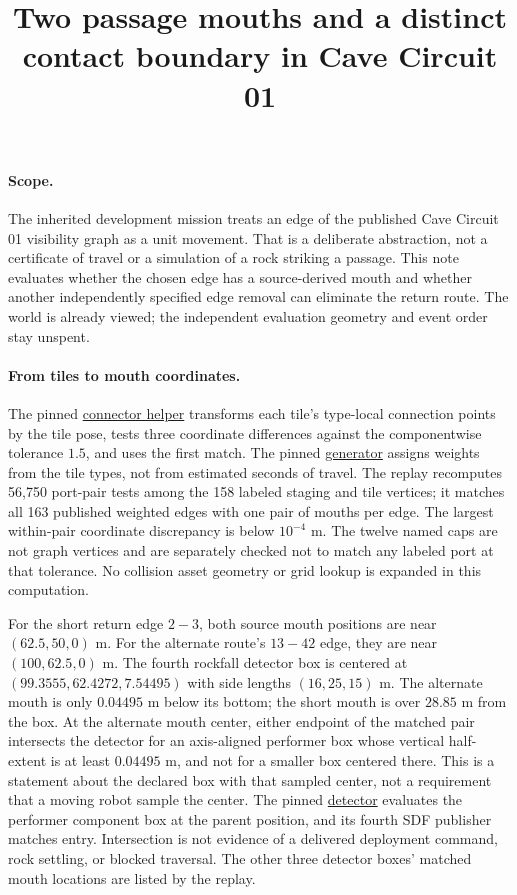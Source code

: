 \documentclass[11pt]{article}
\title{Two passage mouths and a distinct contact boundary in Cave Circuit 01}
\author{}\date{}
\begin{document}
\maketitle

\paragraph{Scope.}
The inherited development mission treats an edge of the published
Cave Circuit 01 visibility graph as a unit movement. That is a
deliberate abstraction, not a certificate of travel or a simulation of
a rock striking a passage. This note evaluates whether the chosen edge
has a source-derived mouth and whether another independently specified
edge removal can eliminate the return route. The world is already
viewed; the independent evaluation geometry and event order stay unspent.

\paragraph{From tiles to mouth coordinates.}
The pinned \href{https://github.com/osrf/subt/blob/083c6a8acb0c25aa1a35e34517e628cd3b52ae77/subt_ign/src/ConnectionHelper.cc}
{connector helper} transforms each tile's type-local connection points
by the tile pose, tests three coordinate differences against the
componentwise tolerance $1.5$, and uses the first match.
The pinned \href{https://github.com/osrf/subt/blob/083c6a8acb0c25aa1a35e34517e628cd3b52ae77/subt_ign/src/apps/dot_generator.cc}
{generator} assigns weights from the tile types, not from estimated
seconds of travel. The replay recomputes 56,750 port-pair tests among the
158 labeled staging and tile vertices; it matches all 163 published
weighted edges with one pair of mouths per edge. The largest within-pair
coordinate discrepancy is below $10^{-4}$ m. The twelve named caps
are not graph vertices and are separately checked not to match any
labeled port at that tolerance. No collision asset geometry or grid lookup
is expanded in this computation.

For the short return edge $2\!-\!3$, both source mouth positions are
near $(62.5,50,0)$ m. For the alternate route's $13\!-\!42$ edge,
they are near $(100,62.5,0)$ m. The fourth rockfall detector box is
centered at $(99.3555,62.4272,7.54495)$ with side lengths $(16,25,15)$
m. The alternate mouth is only $0.04495$ m below its bottom;
the short mouth is over $28.85$ m from the box. At the alternate
mouth center, either endpoint of the matched pair intersects the
detector for an axis-aligned performer box whose vertical half-extent
is at least $0.04495$ m, and not for a smaller box centered there.
This is a statement about the declared box with that sampled center,
not a requirement that a moving robot sample the center. The pinned
\href{https://github.com/gazebosim/gz-sim/blob/2a076e91c6df7699284ab93e244894bb0f55336f/src/systems/performer_detector/PerformerDetector.cc}
{detector} evaluates the performer component box at the parent
position, and its fourth SDF publisher matches entry. Intersection
is not evidence of a delivered deployment command, rock settling,
or blocked traversal. The other three detector boxes' matched mouth
locations are listed by the replay.
\end{document}
